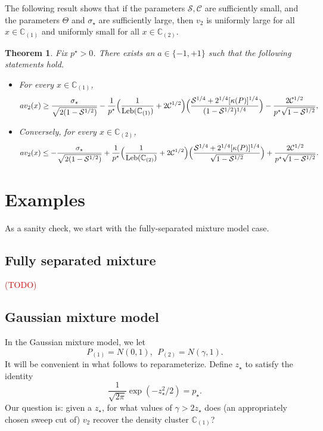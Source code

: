 \documentclass{article}
\newcommand{\1}{\mathbf{1}}
\newcommand{\mc}[1]{\mathcal{#1}}
\newcommand{\mb}[1]{\mathbb{#1}}
\theoremstyle{alden}
\theoremstyle{aldenthm}
\newtheorem{theorem}{Theorem}
\theoremstyle{definition}
\theoremstyle{remark}
\begin{document}
The following result shows that if the parameters $\mc{S}, \mc{C}$ are sufficiently small, and the parameters $\Theta$ and $\sigma_{\star}$ are sufficiently large, then $v_2$ is uniformly large for all $x \in \mathbb{C}_{(1)}$ and uniformly small for all $x \in \mathbb{C}_{(2)}$. 
\begin{theorem}
	\label{thm:uniform_bound}
	Fix $p^{\star} > 0$. There exists an $a \in \{-1,+1\}$ such that the following statements hold.
	\begin{itemize}
		\item For every $x \in \mb{C}_{(1)}$,
		\begin{equation*}
		av_2(x) \geq \frac{\sigma_{\star}}{\sqrt{2(1 - \mc{S}^{1/2})}} - \frac{1}{p^{\star}}\Bigl(\frac{1}{\mathrm{Leb}(\mb{C}_{(1)})} + 2\mc{C}^{1/2}  \Bigr) \Bigl(\frac{\mc{S}^{1/4} + 2^{1/4}[\kappa(P)]^{1/4}}{(1 - \mc{S}^{1/2})^{1/4}}\Bigr) - \frac{2\mc{C}^{1/2}}{p^{\star}\sqrt{1 - \mc{S}^{1/2}}},
		\end{equation*}
		\item Conversely, for every $x \in \mb{C}_{(2)}$,
		\begin{equation*}
		av_2(x) \leq -\frac{\sigma_{\star}}{\sqrt{2(1 - \mc{S}^{1/2})}} + \frac{1}{p^{\star}}\Bigl(\frac{1}{\mathrm{Leb}(\mb{C}_{(2)})} + 2\mc{C}^{1/2}  \Bigr) \Bigl(\frac{\mc{S}^{1/4} + 2^{1/4}[\kappa(P)]^{1/4}}{\sqrt{1 - \mc{S}^{1/2}}}\Bigr) + \frac{2\mc{C}^{1/2}}{p^{\star}\sqrt{1 - \mc{S}^{1/2}}}.
		\end{equation*}
	\end{itemize}
\end{theorem}

\section{Examples}

As a sanity check, we start with the fully-separated mixture model case. 

\subsection{Fully separated mixture}
\textcolor{red}{(TODO)}

\subsection{Gaussian mixture model}
In the Gaussian mixture model, we let
\begin{equation*}
P_{(1)} = N(0,1),~~P_{(2)}= N(\gamma,1).
\end{equation*}
It will be convenient in what follows to reparameterize. Define $z_{\star}$ to satisfy the identity
\begin{equation*}
\frac{1}{\sqrt{2\pi}} \exp(-z_{\star}^2/2) = p_{\star}.
\end{equation*}
Our question is: given a $z_{\star}$, for what values of $\gamma > 2z_{\star}$ does (an appropriately chosen sweep cut of) $v_2$ recover the density cluster $\mb{C}_{(1)}$?
\end{document}
